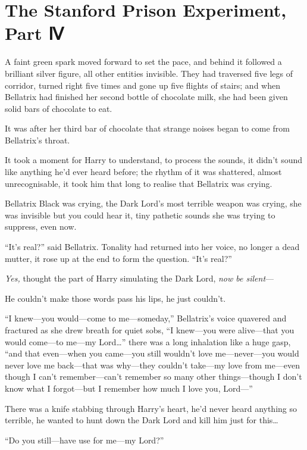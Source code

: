\chapter{The Stanford Prison Experiment, Part
Ⅳ}\label{the-stanford-prison-experiment-part}

A faint green spark moved forward to set the pace, and behind it
followed a brilliant silver figure, all other entities invisible. They
had traversed five legs of corridor, turned right five times and gone up
five flights of stairs; and when Bellatrix had finished her second
bottle of chocolate milk, she had been given solid bars of chocolate to
eat.

It was after her third bar of chocolate that strange noises began to
come from Bellatrix's throat.

It took a moment for Harry to understand, to process the sounds, it
didn't sound like anything he'd ever heard before; the rhythm of it was
shattered, almost unrecognisable, it took him that long to realise that
Bellatrix was crying.

Bellatrix Black was crying, the Dark Lord's most terrible weapon was
crying, she was invisible but you could hear it, tiny pathetic sounds
she was trying to suppress, even now.

``It's real?'' said Bellatrix. Tonality had returned into her voice, no
longer a dead mutter, it rose up at the end to form the question. ``It's
real?''

\emph{Yes,} thought the part of Harry simulating the Dark Lord,
\emph{now be silent}---

He couldn't make those words pass his lips, he just couldn't.

``I knew---you would---come to me---someday,'' Bellatrix's voice
quavered and fractured as she drew breath for quiet sobs, ``I knew---you
were alive---that you would come---to me---my Lord\ldots{}'' there was a
long inhalation like a huge gasp, ``and that even---when you came---you
still wouldn't love me---never---you would never love me back---that was
why---they couldn't take---my love from me---even though I can't
remember---can't remember so many other things---though I don't know
what I forgot---but I remember how much I love you, Lord---''

There was a knife stabbing through Harry's heart, he'd never heard
anything so terrible, he wanted to hunt down the Dark Lord and kill him
just for this\ldots{}

``Do you still---have use for me---my Lord?''

